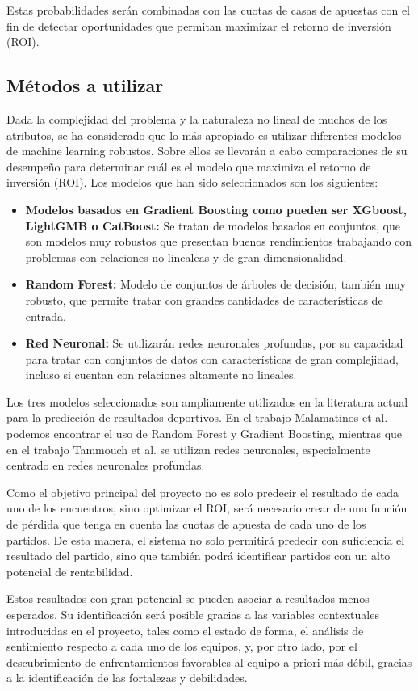 Estas probabilidades serán combinadas con las cuotas de casas de apuestas con el fin de detectar oportunidades que permitan maximizar el retorno de inversión (ROI).

\subsection{Métodos a utilizar}

Dada la complejidad del problema y la naturaleza no lineal de muchos de los atributos, se ha considerado que lo más apropiado es utilizar diferentes modelos de machine learning robustos. Sobre ellos se llevarán a cabo comparaciones de su desempeño para determinar cuál es el modelo que maximiza el retorno de inversión (ROI). Los modelos que han sido seleccionados son los siguientes:

\begin{itemize}
    \item \textbf{Modelos basados en Gradient Boosting como pueden ser XGboost, LightGMB o CatBoost:} Se tratan de modelos basados en conjuntos, que son modelos muy robustos que presentan buenos rendimientos trabajando con problemas con relaciones no linealeas y de gran dimensionalidad.
    \item \textbf{Random Forest:} Modelo de conjuntos de árboles de decisión, también muy robusto, que permite tratar con grandes cantidades de características de entrada.
    \item \textbf{Red Neuronal:} Se utilizarán redes neuronales profundas, por su capacidad para tratar con conjuntos de datos con características de gran complejidad, incluso si cuentan con relaciones altamente no lineales.
\end{itemize}

Los tres modelos seleccionados son ampliamente utilizados en la literatura actual para la predicción de resultados deportivos. En el trabajo Malamatinos et al. \cite{Malamatinos2022GreekLeague} podemos encontrar el uso de Random Forest y Gradient Boosting, mientras que en el trabajo Tammouch et al. \cite{Tammouch2024BettingML} se utilizan redes neuronales, especialmente centrado en redes neuronales profundas.

Como el objetivo principal del proyecto no es solo predecir el resultado de cada uno de los encuentros, sino optimizar el ROI, será necesario crear de una función de pérdida que tenga en cuenta las cuotas de apuesta de cada uno de los partidos. De esta manera, el sistema no solo permitirá predecir con suficiencia el resultado del partido, sino que también podrá identificar partidos con un alto potencial de rentabilidad.

Estos resultados con gran potencial se pueden asociar a resultados menos esperados. Su identificación será posible gracias a las variables contextuales introducidas en el proyecto, tales como el estado de forma, el análisis de sentimiento respecto a cada uno de los equipos, y, por otro lado, por el descubrimiento de enfrentamientos favorables al equipo a priori más débil, gracias a la identificación de las fortalezas y debilidades.